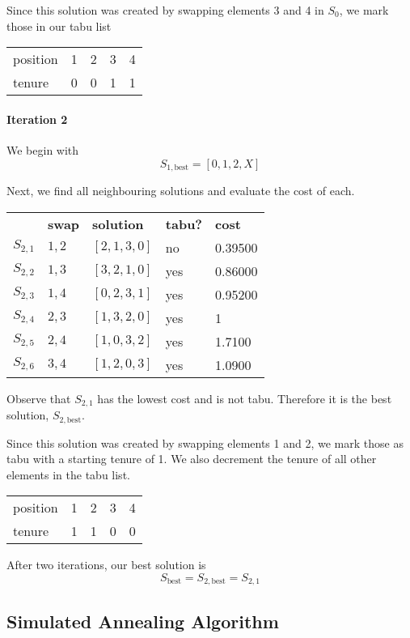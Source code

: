 \documentclass[a4paper]{article}
\newcommand{\subsubsubsection}[1]{\paragraph{#1} \mbox{}}
\begin{document}
Since this solution was created by swapping elements 3 and 4 in $S_0$, we mark those in our tabu list

\begin{tabular}{lllll}
position & 1 & 2 & 3 & 4 \\
tenure   & 0 & 0 & 1 & 1
\end{tabular}
\vspace{1.5em}

\subsubsubsection{Iteration 2}

We begin with $$S_{1, \text{best}} = [0, 1, 2, X]$$

Next, we find all neighbouring solutions and evaluate the cost of each.

\begin{tabular}{lllll}
& \textbf{swap}   & \textbf{solution}    & \textbf{tabu?} & \textbf{cost}  \\

$S_{2,1}$ & $1,2$ & $[2, 1, 3, 0]$ & no  & 0.39500 \\
$S_{2,2}$ & $1,3$ & $[3, 2, 1, 0]$ & yes & 0.86000 \\
$S_{2,3}$ & $1,4$ & $[0, 2, 3, 1]$ & yes & 0.95200 \\
$S_{2,4}$ & $2,3$ & $[1, 3, 2, 0]$ & yes & 1       \\
$S_{2,5}$ & $2,4$ & $[1, 0, 3, 2]$ & yes & 1.7100  \\
$S_{2,6}$ & $3,4$ & $[1, 2, 0, 3]$ & yes & 1.0900  \\
\end{tabular}

Observe that $S_{2,1}$ has the lowest cost and is not tabu. Therefore it is the best solution, $S_{2, \text{best}}$.

Since this solution was created by swapping elements 1 and 2, we mark those as tabu with a starting tenure of 1. We also decrement the tenure of all other elements in the tabu list.

\begin{tabular}{lllll}
position & 1 & 2 & 3 & 4 \\
tenure   & 1 & 1 & 0 & 0
\end{tabular}
\vspace{1.5em}

After two iterations, our best solution is
$$S_{\text{best}} = S_{2, \text{best}} = S_{2,1}$$

\subsection{Simulated Annealing Algorithm} %
\end{document}
